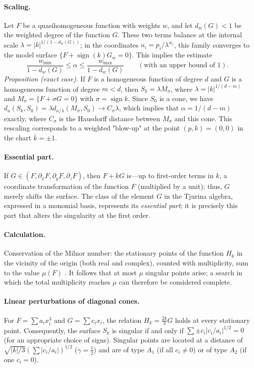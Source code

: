 \documentclass[11pt, a4paper]{article}
\theoremstyle{plain}
\theoremstyle{definition}
\theoremstyle{remark}
\theoremstyle{definition}
\begin{document}
\paragraph{Scaling.} Let $F$ be a quasihomogeneous function with weights $w$, and let
$d_w(G) < 1$ be the weighted degree of the function $G$. These two terms balance at the internal scale
$\lambda = |k|^{1/(1-d_w(G))}$; in the coordinates $u_i = p_i/\lambda^{w_i}$, this family
converges to the model surface $\{F + \operatorname{sign}(k)G_w = 0\}$. This implies the estimate
\[
\frac{w_{\min}}{1-d_w(G)} \le \alpha \le \frac{w_{\max}}{1-d_w(G)} \qquad (\text{with an upper bound of } 1).
\]
\emph{Proposition (exact case).} If $F$ is a homogeneous function of degree $d$ and $G$ is
a homogeneous function of degree $m < d$, then $S_k = \lambda M_\sigma$, where $\lambda = |k|^{1/(d-m)}$
and $M_\sigma = \{F + \sigma G = 0\}$ with $\sigma = \operatorname{sign} k$. Since $S_0$ is a cone,
we have $d_a(S_k, S_0) = \lambda d_{a/\lambda}(M_\sigma, S_0) \to C_\sigma \lambda$, which implies that
$\alpha = 1/(d-m)$ exactly, where $C_\sigma$ is the Hausdorff distance between $M_\sigma$ and this cone.
This rescaling corresponds to a weighted "blow-up" at the point $(p, k) = (0, 0)$ in the chart $\bar k = \pm 1$.

\paragraph{Essential part.} If $G\in(F,\partial_xF,\partial_yF,\partial_zF)$, then $F+kG$ is—up to first-order terms in $k$, a coordinate transformation of the function $F$ (multiplied by a unit); thus, $G$ merely shifts the surface. The class of the element $G$ in the Tjurina algebra, expressed in a monomial basis, represents its \emph{essential part}; it is precisely this part that alters the singularity at the first order.

\paragraph{Calculation.} Conservation of the Milnor number: the stationary points of the function $H_k$ in the vicinity of the origin (both real and complex), counted with multiplicity, sum to the value $\mu(F)$ \cite{milnor1968singular,greuel2007introduction}. It follows that at most $\mu$ singular points arise; a search in which the total multiplicity reaches $\mu$ can therefore be considered complete.

\paragraph{Linear perturbations of diagonal cones.} For $F=\sum a_ix_i^3$ and $G=\sum c_ix_i$, the relation $H_k=\tfrac{2k}{3}G$ holds at every stationary point. Consequently, the surface $S_k$ is singular if and only if $\sum\pm c_i|c_i/a_i|^{1/2}=0$ (for an appropriate choice of signs). Singular points are located at a distance of $\sqrt{|k|/3}(\sum|c_i/a_i|)^{1/2}$ ($\gamma=\tfrac12$) and are of type $A_1$ (if all $c_i\neq0$) or of type $A_2$ (if one $c_i=0$).
\end{document}
